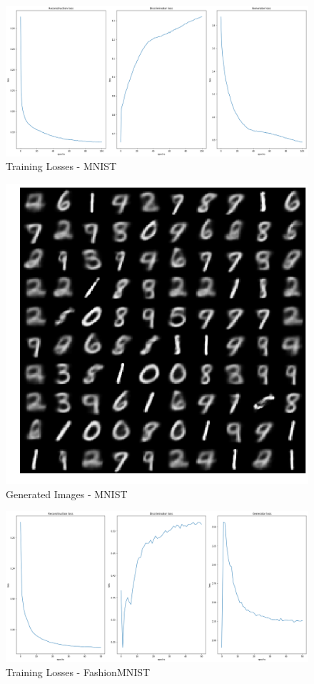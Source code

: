 \documentclass[11pt]{article}
\begin{document}
\begin{figure}
\centering
\includegraphics[width=\textwidth]{plots.png}
\caption{\label{fig:plots} Training Losses - MNIST}
\end{figure}

\begin{figure}
\centering
\includegraphics[width=\textwidth]{results.png}
\caption{\label{fig:results} Generated Images - MNIST}
\end{figure}

\begin{figure}
\centering
\includegraphics[width=\textwidth]{fashion_plots.png}
\caption{\label{fig:fplot} Training Losses - FashionMNIST}
\end{figure}
\end{document}
